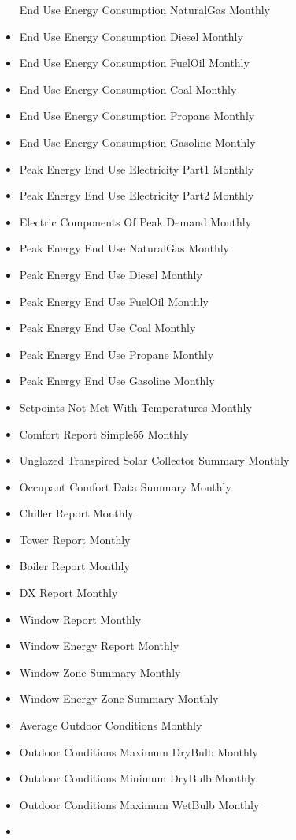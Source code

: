 \begin{itemize}
  End Use Energy Consumption NaturalGas Monthly
\item
  End Use Energy Consumption Diesel Monthly
\item
  End Use Energy Consumption FuelOil Monthly
\item
  End Use Energy Consumption Coal Monthly
\item
  End Use Energy Consumption Propane Monthly
\item
  End Use Energy Consumption Gasoline Monthly
\item
  Peak Energy End Use Electricity Part1 Monthly
\item
  Peak Energy End Use Electricity Part2 Monthly
\item
  Electric Components Of Peak Demand Monthly
\item
  Peak Energy End Use NaturalGas Monthly
\item
  Peak Energy End Use Diesel Monthly
\item
  Peak Energy End Use FuelOil Monthly
\item
  Peak Energy End Use Coal Monthly
\item
  Peak Energy End Use Propane Monthly
\item
  Peak Energy End Use Gasoline Monthly
\item
  Setpoints Not Met With Temperatures Monthly
\item
  Comfort Report Simple55 Monthly
\item
  Unglazed Transpired Solar Collector Summary Monthly
\item
  Occupant Comfort Data Summary Monthly
\item
  Chiller Report Monthly
\item
  Tower Report Monthly
\item
  Boiler Report Monthly
\item
  DX Report Monthly
\item
  Window Report Monthly
\item
  Window Energy Report Monthly
\item
  Window Zone Summary Monthly
\item
  Window Energy Zone Summary Monthly
\item
  Average Outdoor Conditions Monthly
\item
  Outdoor Conditions Maximum DryBulb Monthly
\item
  Outdoor Conditions Minimum DryBulb Monthly
\item
  Outdoor Conditions Maximum WetBulb Monthly
\item

\end{itemize}

